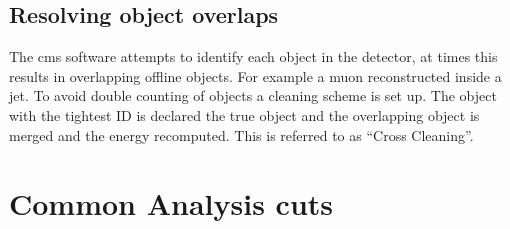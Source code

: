 \subsection{Resolving object overlaps} %
\label{sub:cross_cleaning}
The \ac{cms} software attempts to identify each object in the detector, at 
times this results in overlapping offline objects. For example a muon 
reconstructed inside a jet. To avoid double counting of objects a cleaning 
scheme is set up. The object with the tightest ID is declared the true object 
and the overlapping object is merged and the energy recomputed. This is referred to as ``Cross Cleaning''.


\section{Common Analysis cuts} %
\label{sec:common_analysis_cuts}



